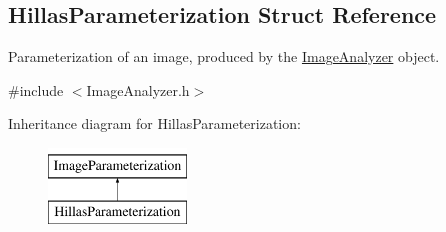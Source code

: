 \hypertarget{structHillasParameterization}{
\subsection{HillasParameterization Struct Reference}
\label{structHillasParameterization}
}


Parameterization of an image, produced by the \hyperlink{classImageAnalyzer}{ImageAnalyzer} object.  




{\ttfamily \#include $<$ImageAnalyzer.h$>$}

Inheritance diagram for HillasParameterization:\begin{figure}[H]
\begin{center}
\leavevmode
\includegraphics[height=2.000000cm]{structHillasParameterization}
\end{center}
\end{figure}
